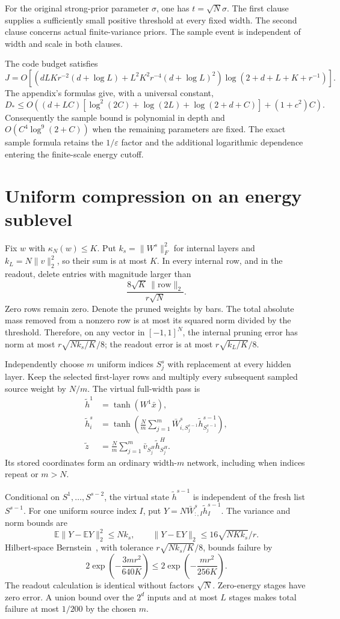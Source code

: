 \documentclass[11pt]{article}
\begin{document}
For the original strong-prior parameter $\sigma$, one has $t=\sqrt N\sigma$.
The first clause supplies a sufficiently small positive threshold at every
fixed width. The second clause concerns actual finite-variance priors.
The sample event is independent of width and scale in both clauses.

The code budget satisfies
\[
 J=O\!\left[
 \left(dLKr^{-2}(d+\log L)+L^2K^2r^{-4}(d+\log L)^2\right)
 \log(2+d+L+K+r^{-1})\right].
\]
The appendix's formulas give, with a universal constant,
\[
 D_*\le O\!\left((d+LC)
 [\log^2(2C)+\log(2L)+\log(2+d+C)]+(1+c^2)C\right).
\]
Consequently the sample bound is polynomial in depth and
$O(C^4\log^9(2+C))$ when the remaining parameters are fixed.
The exact sample formula retains the $1/\varepsilon$ factor and the
additional logarithmic dependence entering the finite-scale energy cutoff.

\section{Uniform compression on an energy sublevel}
Fix $w$ with $\kappa_N(w)\le K$. Put $k_s=\|W^s\|_F^2$ for internal
layers and $k_L=N\|v\|_2^2$, so their sum is at most $K$.
In every internal row, and in the readout, delete entries with magnitude
larger than
\[
 \frac{8\sqrt K\,\|\text{row}\|_2}{r\sqrt N}.
\]
Zero rows remain zero. Denote the pruned weights by bars. The total
absolute mass removed from a nonzero row is at most its squared norm
divided by the threshold. Therefore, on any vector in $[-1,1]^N$,
the internal pruning error has norm at most $r\sqrt{Nk_s/K}/8$;
the readout error is at most $r\sqrt{k_L/K}/8$.

Independently choose $m$ uniform indices $S^s_j$ with replacement at every
hidden layer. Keep the selected first-layer rows and multiply every
subsequent sampled source weight by $N/m$. The virtual full-width pass is
\begin{align*}
 \widetilde h^1&=\tanh(W^1\bar x),\\
 \widetilde h^s_i&=\tanh\!\left(\frac Nm\sum_{j=1}^m
 \bar W^s_{i,S^{s-1}_j}\widetilde h^{s-1}_{S^{s-1}_j}\right),\\
 \widetilde z&=\frac Nm\sum_{j=1}^m
 \bar v_{S^H_j}\widetilde h^H_{S^H_j}.
\end{align*}
Its stored coordinates form an ordinary width-$m$ network, including
when indices repeat or $m>N$.

Conditional on $S^1,\ldots,S^{s-2}$, the virtual state
$\widetilde h^{s-1}$ is independent of the fresh list $S^{s-1}$.
For one uniform source index $I$, put
$Y=N\bar W^s_{:,I}\widetilde h^{s-1}_I$. The variance and norm bounds are
\[
 \mathbb E\|Y-\mathbb EY\|_2^2\le Nk_s,
 \qquad \|Y-\mathbb EY\|_2\le16\sqrt{NKk_s}/r.
\]
Hilbert-space Bernstein~\cite{tarres-yao}, with tolerance
$r\sqrt{Nk_s/K}/8$, bounds failure by
\[
 2\exp\!\left(-\frac{3mr^2}{640K}\right)
 \le2\exp\!\left(-\frac{mr^2}{256K}\right).
\]
The readout calculation is identical without factors $\sqrt N$.
Zero-energy stages have zero error. A union bound over the $2^d$ inputs
and at most $L$ stages makes total failure at most $1/200$ by the chosen $m$.
\end{document}
